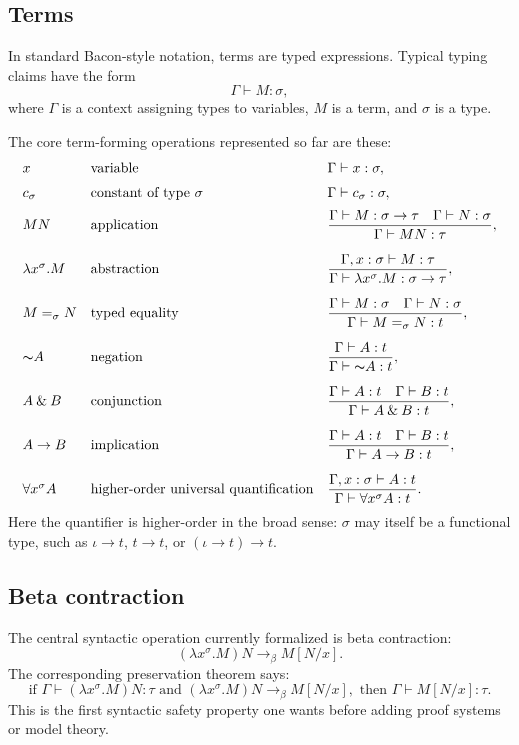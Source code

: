 \documentclass[12pt,leqno]{article}
\newcommand{\AND}{\ensuremath{\mathbin{\&}}}
\newcommand{\IC}{\ensuremath{\rightarrow}}
\newcommand{\NOT}{\ensuremath{\text{$\thicksim$}}}
\newcommand{\types}{\mathrel{\vdash}}
\newcommand{\betastep}{\mathrel{\to_\beta}}
\begin{document}
\subsection{Terms}

In standard Bacon-style notation, terms are typed expressions.  Typical typing
claims have the form
\[
  \Gamma \types M:\sigma,
\]
where $\Gamma$ is a context assigning types to variables, $M$ is a term, and
$\sigma$ is a type.

The core term-forming operations represented so far are these:
\[
\begin{array}{lll}
  x & \text{variable} & \Gamma \types x:\sigma,\\[2mm]
  c_\sigma & \text{constant of type }\sigma
    & \Gamma \types c_\sigma:\sigma,\\[2mm]
  MN & \text{application}
    & \dfrac{\Gamma \types M:\sigma\to\tau\quad
              \Gamma \types N:\sigma}
             {\Gamma \types MN:\tau},\\[5mm]
  \lambda x^\sigma.M & \text{abstraction}
    & \dfrac{\Gamma,x:\sigma \types M:\tau}
             {\Gamma \types \lambda x^\sigma.M:\sigma\to\tau},\\[5mm]
  M =_\sigma N & \text{typed equality}
    & \dfrac{\Gamma \types M:\sigma\quad
              \Gamma \types N:\sigma}
             {\Gamma \types M =_\sigma N:t},\\[5mm]
  \NOT A & \text{negation}
    & \dfrac{\Gamma \types A:t}{\Gamma \types \NOT A:t},\\[5mm]
  A \AND B & \text{conjunction}
    & \dfrac{\Gamma \types A:t\quad \Gamma \types B:t}
             {\Gamma \types A\AND B:t},\\[5mm]
  A \IC B & \text{implication}
    & \dfrac{\Gamma \types A:t\quad \Gamma \types B:t}
             {\Gamma \types A\IC B:t},\\[5mm]
  \forall x^\sigma A & \text{higher-order universal quantification}
    & \dfrac{\Gamma,x:\sigma \types A:t}
             {\Gamma \types \forall x^\sigma A:t}.
\end{array}
\]
Here the quantifier is higher-order in the broad sense: $\sigma$ may itself be
a functional type, such as $\iota\to t$, $t\to t$, or
$(\iota\to t)\to t$.

\subsection{Beta contraction}

The central syntactic operation currently formalized is beta contraction:
\[
  (\lambda x^\sigma.M)N \betastep M[N/x].
\]
The corresponding preservation theorem says:
\[
  \text{if }\Gamma\types(\lambda x^\sigma.M)N:\tau
  \text{ and }(\lambda x^\sigma.M)N\betastep M[N/x],
  \text{ then }\Gamma\types M[N/x]:\tau.
\]
This is the first syntactic safety property one wants before adding proof
systems or model theory.
\end{document}
